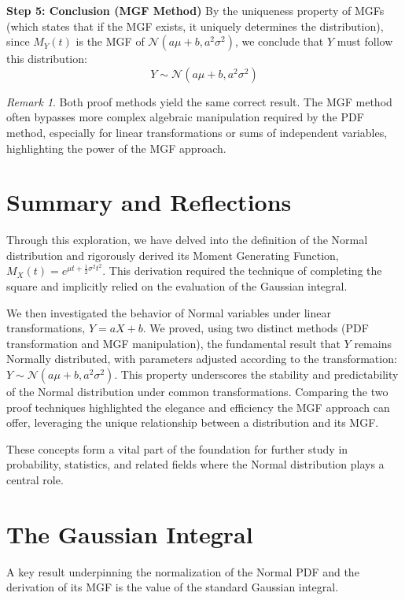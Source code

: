\documentclass[11pt, letterpaper]{article}
\theoremstyle{definition}
\theoremstyle{remark}
\newtheorem{remark}[theorem]{Remark}
\begin{document}
\textbf{Step 5: Conclusion (MGF Method)}
By the uniqueness property of MGFs (which states that if the MGF exists, it uniquely determines the distribution), since $M_Y(t)$ is the MGF of $\mathcal{N}(a\mu+b, a^2\sigma^2)$, we conclude that $Y$ must follow this distribution:
$$ Y \sim \mathcal{N}(a\mu+b, a^2\sigma^2) $$

\begin{remark}
Both proof methods yield the same correct result. The MGF method often bypasses more complex algebraic manipulation required by the PDF method, especially for linear transformations or sums of independent variables, highlighting the power of the MGF approach.
\end{remark}

\section{Summary and Reflections}

Through this exploration, we have delved into the definition of the Normal distribution and rigorously derived its Moment Generating Function, $M_X(t) = e^{\mu t + \frac{1}{2}\sigma^2 t^2}$. This derivation required the technique of completing the square and implicitly relied on the evaluation of the Gaussian integral.

We then investigated the behavior of Normal variables under linear transformations, $Y=aX+b$. We proved, using two distinct methods (PDF transformation and MGF manipulation), the fundamental result that $Y$ remains Normally distributed, with parameters adjusted according to the transformation: $Y \sim \mathcal{N}(a\mu+b, a^2\sigma^2)$. This property underscores the stability and predictability of the Normal distribution under common transformations. Comparing the two proof techniques highlighted the elegance and efficiency the MGF approach can offer, leveraging the unique relationship between a distribution and its MGF.

These concepts form a vital part of the foundation for further study in probability, statistics, and related fields where the Normal distribution plays a central role.

\appendix
\section{The Gaussian Integral}

A key result underpinning the normalization of the Normal PDF and the derivation of its MGF is the value of the standard Gaussian integral.
\end{document}
